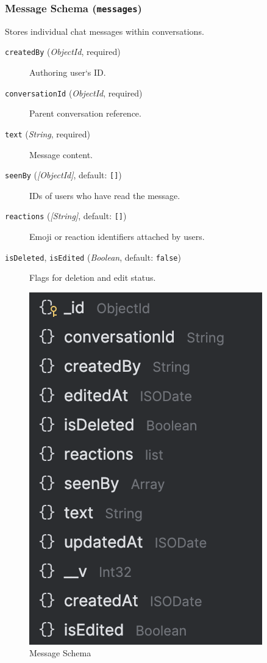 \subsubsection{Message Schema (\texttt{messages})}
Stores individual chat messages within conversations.
\begin{description}
  \item[\texttt{createdBy} (\emph{ObjectId}, required)]  
    Authoring user`s ID.
  \item[\texttt{conversationId} (\emph{ObjectId}, required)]  
    Parent conversation reference.
  \item[\texttt{text} (\emph{String}, required)]  
    Message content.
  \item[\texttt{seenBy} (\emph{[ObjectId]}, default: \texttt{[]})]  
    IDs of users who have read the message.
  \item[\texttt{reactions} (\emph{[String]}, default: \texttt{[]})]  
    Emoji or reaction identifiers attached by users.
  \item[\texttt{isDeleted}, \texttt{isEdited} (\emph{Boolean}, default: \texttt{false})]  
    Flags for deletion and edit status.
\end{description}

\begin{figure}[H]
  \centering
  \includegraphics{message-schema.png}
  \caption*{Message Schema}
  \label{fig:message-schema}
\end{figure}

